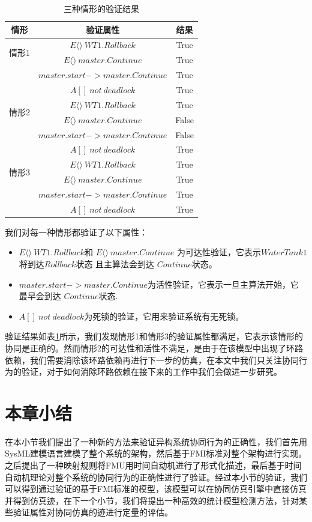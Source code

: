 \begin{table}
\caption{三种情形的验证结果}
\centering
\begin{tabular}{c c c} 
        \hline  
        情形 & 验证属性 & 结果\\
        \hline
        \multirow{2}{2.0cm}{情形1}  
                & $E\langle\rangle~WT1.Rollback$ & True\\ 
                & $E\langle\rangle~master.Continue$ & True\\ 
                & $master.start -> master.Continue$ & True\\ 
                & $A[]~not~deadlock$ & True\\   
        \hline 
        \multirow{2}{2.0cm}{情形2}  
                & $E\langle\rangle~WT1.Rollback$ & True\\ 
                & $E\langle\rangle~master.Continue$ & False\\ 
                & $master.start -> master.Continue$ & False\\ 
                & $A[]~not~deadlock$ & True\\   
        \hline 
        \multirow{2}{2.0cm}{情形3}  
                & $E\langle\rangle~WT1.Rollback$ & True\\ 
                & $E\langle\rangle~master.Continue$ & True\\ 
                & $master.start -> master.Continue$ & True\\ 
                & $A[]~not~deadlock$ & True\\   
        \hline 
\end{tabular} 
\label{rs}
\end{table}

我们对每一种情形都验证了以下属性：
\begin{itemize}
\item
$E\langle\rangle~WT1.Rollback$和 $E\langle\rangle~master.Continue$ 为可达性验证，它表示$WaterTank1$将到达$Rollback$状态 且主算法会到达 $Continue$状态。
\item
$master.start -> master.Continue$为活性验证，它表示一旦主算法开始，它最早会到达 $Continue$状态.
\item 
$A[]~not~deadlock$为死锁的验证，它用来验证系统有无死锁。
\end{itemize}

验证结果如表\ref{rs}所示，我们发现情形1和情形3的验证属性都满足，它表示该情形的协同是正确的。然而情形2的可达性和活性不满足，是由于在该模型中出现了环路依赖，我们需要消除该环路依赖再进行下一步的仿真，在本文中我们只关注协同行为的验证，对于如何消除环路依赖在接下来的工作中我们会做进一步研究。 


\section{本章小结}
在本小节我们提出了一种新的方法来验证异构系统协同行为的正确性，我们首先用SysML建模语言建模了整个系统的架构，然后基于FMI标准对整个架构进行实现。之后提出了一种映射规则将FMU用时间自动机进行了形式化描述，最后基于时间自动机理论对整个系统的协同行为的正确性进行了验证。经过本小节的验证，我们可以得到通过验证的基于FMI标准的模型，该模型可以在协同仿真引擎中直接仿真并得到仿真迹，在下一个小节，我们将提出一种高效的统计模型检测方法，针对某些验证属性对协同仿真的迹进行定量的评估。